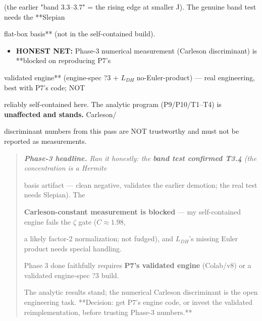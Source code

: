 \documentclass[10pt]{article}
\begin{document}
  (the earlier "band 3.3--3.7" = the rising edge at smaller J). The genuine band test needs the **Slepian\par
  flat-box basis** (not in the self-contained build).\par
\begin{itemize}
\item \textbf{HONEST NET:} Phase-3 numerical measurement (Carleson discriminant) is **blocked on reproducing P7's
\end{itemize}
  validated engine** (engine-spec ?3 + $L_{DH}$ no-Euler-product) --- real engineering, best with P7's code; NOT\par
  reliably self-contained here. The analytic program (P9/P10/T1--T4) is \textbf{unaffected and stands.} Carleson/\par
  discriminant numbers from this pass are NOT trustworthy and must not be reported as measurements.\par

\begin{quote}\itshape
\textbf{Phase-3 headline.} Ran it honestly: the \textbf{band test confirmed T3.4} (the concentration is a Hermite\par
basis artifact --- clean negative, validates the earlier demotion; the real test needs Slepian). The\par
\textbf{Carleson-constant measurement is blocked} --- my self-contained engine fails the \ensuremath{\zeta} gate ($C\approx1.98$,\par
a likely factor-2 normalization; not fudged), and $L_{DH}$'s missing Euler product needs special handling.\par
Phase 3 done faithfully requires \textbf{P7's validated engine} (Colab/v8) or a validated engine-spec ?3 build.\par
The analytic results stand; the numerical Carleson discriminant is the open engineering task. **Decision: get P7's engine code, or invest the validated reimplementation, before trusting Phase-3 numbers.**\par
\end{quote}
\end{document}
